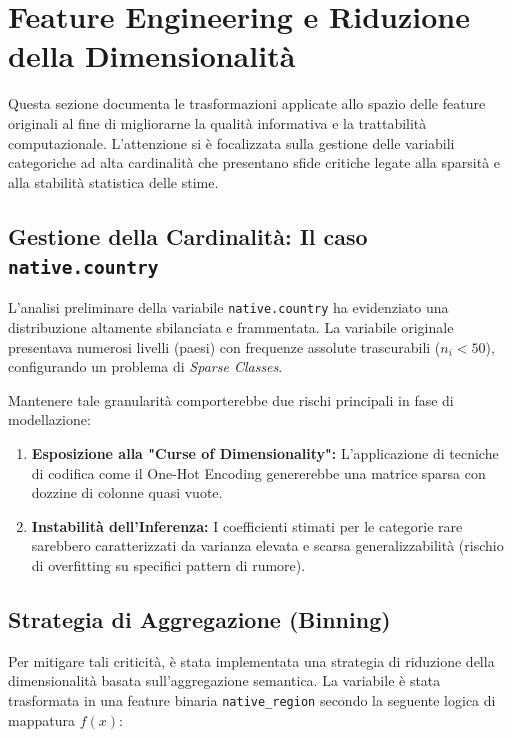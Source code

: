 \setcounter{figure}{0}
\renewcommand{\thefigure}{A.\arabic{figure}}
\setcounter{table}{0}
\renewcommand{\thetable}{A.\arabic{table}}

\section{Feature Engineering e Riduzione della Dimensionalità}
\label{app:feature_engineering}

Questa sezione documenta le trasformazioni applicate allo spazio delle feature originali al fine di migliorarne la qualità informativa e la trattabilità computazionale. L'attenzione si è focalizzata sulla gestione delle variabili categoriche ad alta cardinalità che presentano sfide critiche legate alla sparsità e alla stabilità statistica delle stime.

\subsection{Gestione della Cardinalità: Il caso \texttt{native.country}}

L'analisi preliminare della variabile \texttt{native.country} ha evidenziato una distribuzione altamente sbilanciata e frammentata. La variabile originale presentava numerosi livelli (paesi) con frequenze assolute trascurabili ($n_i < 50$), configurando un problema di \textit{Sparse Classes}.

Mantenere tale granularità comporterebbe due rischi principali in fase di modellazione:
\begin{enumerate}
    \item \textbf{Esposizione alla "Curse of Dimensionality":} L'applicazione di tecniche di codifica come il One-Hot Encoding genererebbe una matrice sparsa con dozzine di colonne quasi vuote.
    \item \textbf{Instabilità dell'Inferenza:} I coefficienti stimati per le categorie rare sarebbero caratterizzati da varianza elevata e scarsa generalizzabilità (rischio di overfitting su specifici pattern di rumore).
\end{enumerate}

\subsection{Strategia di Aggregazione (Binning)}
Per mitigare tali criticità, è stata implementata una strategia di riduzione della dimensionalità basata sull'aggregazione semantica. La variabile è stata trasformata in una feature binaria \texttt{native\_region} secondo la seguente logica di mappatura $f(x)$:

